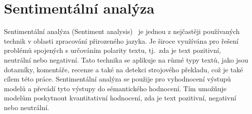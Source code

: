 \section{Sentimentální analýza}
Sentimentální analýza (Sentiment analysis)~\cite{link10} je jednou z nejčastěji používaných technik v oblasti zpracování přirozeného jazyka.\@
Je široce využívána pro řešení problémů spojených s určováním polarity textu, tj.\ zda je text pozitivní, neutrální nebo negativní.
Tato technika se aplikuje na různé typy textů, jako jsou dotazníky, komentáře, recenze a také na detekci strojového překladu, což je také cílem této práce.
Sentimentální analýza se použije pro vyhodnocení výstupů modelů a převádí tyto výstupy do sémantického hodnocení.
Tím umožňuje modelům poskytnout kvantitativní hodnocení, zda je text pozitivní, negativní nebo neutrální.

\endinput